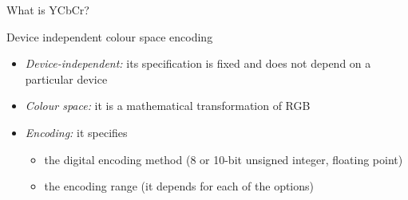 \documentclass[aspectratio=169,handout]{fireshonks}
\begin{document}
\begin{frame}{What is YCbCr?}
    \begin{center}
        Device independent colour space encoding
    \end{center}

    \begin{itemize}[<+(1)->]
        \item \emph{Device-independent:} its specification is fixed and does not depend on a particular device
        \item \emph{Colour space:} it is a mathematical transformation of RGB
        \item \emph{Encoding:} it specifies
              \begin{itemize}
                  \item the digital encoding method (8 or 10-bit unsigned integer, floating point)
                  \item the encoding range (it depends for each of the options)
              \end{itemize}
    \end{itemize}
\end{frame}
\end{document}
